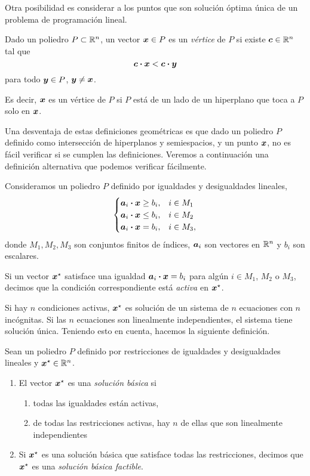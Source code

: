 Otra posibilidad es considerar a los puntos que son solución óptima única de un problema de programación lineal.

\begin{definition}
  Dado un poliedro $P \subset \mathbb{R}^n$, un vector $\bm{x} \in P$ es un \emph{vértice} de $P$ si existe $\bm{c} \in \mathbb{R}^n$ tal que
  $$\bm{c} \boldsymbol{\cdot} \bm{x} < \bm{c} \boldsymbol{\cdot} \bm{y}$$
   para todo $\bm{y} \in P$, $\bm{y} \neq \bm{x}$.
\end{definition}

Es decir, $\bm{x}$ es un vértice de $P$ si $P$ está de un lado de un hiperplano que toca a $P$ solo en $\bm{x}$.

Una desventaja de estas definiciones geométricas es que dado un poliedro $P$ definido como intersección de hiperplanos y semiespacios, y un punto $\bm{x}$, no es fácil verificar si se cumplen las definiciones. Veremos a continuación una definición alternativa que podemos verificar fácilmente.

Consideramos un poliedro $P$ definido por igualdades y desigualdades lineales,
$$
\begin{cases}
\bm{a}_i \boldsymbol{\cdot} \bm{x} \ge b_i, & i \in M_1 \\
\bm{a}_i \boldsymbol{\cdot} \bm{x} \le b_i, & i \in M_2 \\
\bm{a}_i \boldsymbol{\cdot} \bm{x} = b_i, & i \in M_3,
\end{cases}
$$
donde $M_1, M_2, M_3$ son conjuntos finitos de índices, $\bm{a}_i$ son vectores en $\mathbb{R}^n$ y $b_i$ son escalares.

\begin{definition}
Si un vector $\bm{x}^\star$ satisface una igualdad $\bm{a}_i \boldsymbol{\cdot} \bm{x} = b_i$ para alg\'un $i \in M_1$, $M_2$ o $M_3$, decimos que la condición correspondiente está \emph{activa} en $\bm{x}^\star$.
\end{definition}

Si hay $n$ condiciones activas, $\bm{x}^\star$ es solución de un sistema de $n$ ecuaciones con $n$ incógnitas. Si las $n$ ecuaciones son linealmente independientes, el sistema tiene solución única. Teniendo esto en cuenta, hacemos la siguiente definición.

\begin{definition}
Sean un poliedro $P$ definido por restricciones de igualdades y desigualdades lineales y $\bm{x}^\star \in \mathbb{R}^n$.
\begin{enumerate}
\item El vector $\bm{x}^\star$ es una \emph{solución básica} si
\begin{enumerate}
\item todas las igualdades están activas,
\item de todas las restricciones activas, hay $n$ de ellas que son linealmente independientes
\end{enumerate}
\item Si $\bm{x}^\star$ es una solución básica que satisface todas las restricciones, decimos que $\bm{x}^\star$ es una \emph{solución básica factible}.
\end{enumerate}
\end{definition}

